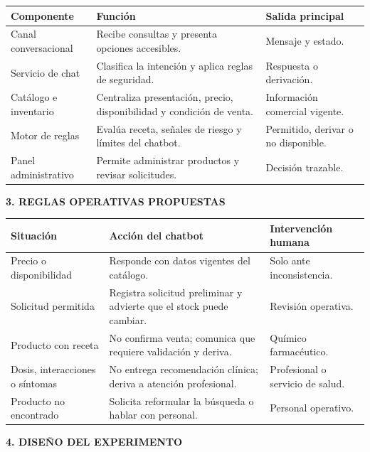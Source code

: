 \documentclass[11pt,a4paper]{article}
\newcommand{\apartado}[1]{\vspace{0.85em}\noindent\textbf{#1}\par\vspace{0.3em}}
\begin{document}
\begin{table}[h!]
\centering
\small
\begin{tabularx}{\textwidth}{p{}Yp{0.23\textwidth}}
\toprule
\textbf{Componente} & \textbf{Función} & \textbf{Salida principal} \\
\midrule
Canal conversacional & Recibe consultas y presenta opciones accesibles. & Mensaje y estado. \\
Servicio de chat & Clasifica la intención y aplica reglas de seguridad. & Respuesta o derivación. \\
Catálogo e inventario & Centraliza presentación, precio, disponibilidad y condición de venta. & Información comercial vigente. \\
Motor de reglas & Evalúa receta, señales de riesgo y límites del chatbot. & Permitido, derivar o no disponible. \\
Panel administrativo & Permite administrar productos y revisar solicitudes. & Decisión trazable. \\
\bottomrule
\end{tabularx}
\end{table}

\apartado{3. REGLAS OPERATIVAS PROPUESTAS}

\begin{table}[h!]
\centering
\small
\begin{tabularx}{\textwidth}{p{}Yp{0.23\textwidth}}
\toprule
\textbf{Situación} & \textbf{Acción del chatbot} & \textbf{Intervención humana} \\
\midrule
Precio o disponibilidad & Responde con datos vigentes del catálogo. & Solo ante inconsistencia. \\
Solicitud permitida & Registra solicitud preliminar y advierte que el stock puede cambiar. & Revisión operativa. \\
Producto con receta & No confirma venta; comunica que requiere validación y deriva. & Químico farmacéutico. \\
Dosis, interacciones o síntomas & No entrega recomendación clínica; deriva a atención profesional. & Profesional o servicio de salud. \\
Producto no encontrado & Solicita reformular la búsqueda o hablar con personal. & Personal operativo. \\
\bottomrule
\end{tabularx}
\end{table}

\apartado{4. DISEÑO DEL EXPERIMENTO}
\end{document}
